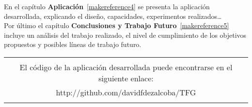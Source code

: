 En el capítulo \textbf{Aplicación}~\ref{makereference4} se presenta la
aplicación desarrollada, explicando el diseño, capacidades, experimentos
realizados\ldots\\

Por último el capítulo \textbf{Conclusiones y Trabajo
Futuro}~\ref{makereference5} incluye un análisis del trabajo realizado, el nivel
de cumplimiento de los objetivos propuestos y posibles líneas de trabajo
futuro.\\

\begin{table}[b]
		\begin{tabular}[b]{|c|}
			\hline
			\\
			El código de la aplicación desarrollada puede encontrarse en el
			siguiente enlace:\\
			http://github.com/davidfdezalcoba/TFG\\
			\\
			\hline
		\end{tabular}
\end{table}

% 
% 
% 
% 



